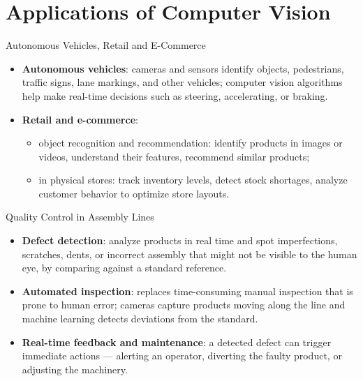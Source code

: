 \section{Applications of Computer Vision}

\begin{frame}{Autonomous Vehicles, Retail and E-Commerce}
\begin{itemize}
  \item \textbf{Autonomous vehicles}: cameras and sensors identify objects, pedestrians, traffic signs, lane markings, and other vehicles; computer vision algorithms help make real-time decisions such as steering, accelerating, or braking.
  \item \textbf{Retail and e-commerce}:
  \begin{itemize}
    \item object recognition and recommendation: identify products in images or videos, understand their features, recommend similar products;
    \item in physical stores: track inventory levels, detect stock shortages, analyze customer behavior to optimize store layouts.
  \end{itemize}
\end{itemize}
\end{frame}

\begin{frame}{Quality Control in Assembly Lines}
\begin{itemize}
  \item \textbf{Defect detection}: analyze products in real time and spot imperfections, scratches, dents, or incorrect assembly that might not be visible to the human eye, by comparing against a standard reference.
  \item \textbf{Automated inspection}: replaces time-consuming manual inspection that is prone to human error; cameras capture products moving along the line and machine learning detects deviations from the standard.
  \item \textbf{Real-time feedback and maintenance}: a detected defect can trigger immediate actions --- alerting an operator, diverting the faulty product, or adjusting the machinery.
\end{itemize}
\end{frame}

